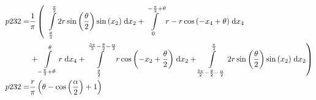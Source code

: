 \begin{align}
    p232 =&\frac{1}{\pi} \left(\;\;\int\limits_{\frac{\theta}{2}}^{\frac{\pi}{2}}2 r \sin{\left (\frac{\theta}{2} \right )} \sin{\left (x_{2} \right )}\;\mathrm{d}x_{2}+\int\limits_{0}^{- \frac{\pi}{2} + \theta}r - r \cos{\left (- x_{4} + \theta \right )}\;\mathrm{d}x_{4}\right.\notag\\
 &\left.+\int\limits_{- \frac{\pi}{2} + \theta}^{\theta}r\;\mathrm{d}x_{4}+\int\limits_{\frac{\theta}{2}}^{\frac{3 \pi}{2} - \frac{\theta}{2} - \frac{\alpha}{2}}r \cos{\left (- x_{2} + \frac{\theta}{2} \right )}\;\mathrm{d}x_{2}+\int\limits_{\frac{3 \pi}{2} - \frac{\theta}{2} - \frac{\alpha}{2}}^{\frac{\pi}{2}}2 r \sin{\left (\frac{\theta}{2} \right )} \sin{\left (x_{2} \right )}\;\mathrm{d}x_{2}\right)\label{p232Def}\\
    p232 =& \frac{r}{\pi} \left(\theta - \cos{\left (\frac{\alpha}{2} \right )} + 1\right)\label{p232Sln}
\end{align}